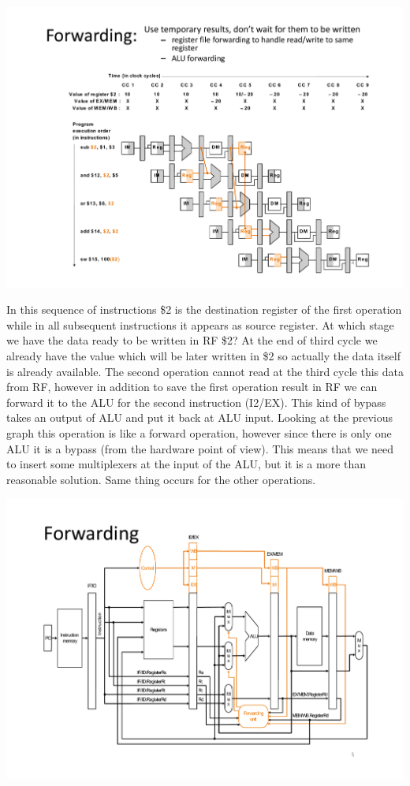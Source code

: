 \begin{center}
  \includegraphics[width=1.0\linewidth]{img/img3/mips3}
\end{center}
In this sequence of instructions \$2 is the destination register of the first
operation while in all subsequent instructions it appears as source register.
At which stage we have the data ready to be written in RF \$2? At the end of
third cycle we already have the value which will be later written in \$2 so
actually the data itself is already available. The second operation cannot read
at the third cycle this data from RF, however in addition to save the first
operation result in RF we can forward it to the ALU for the second instruction
(I2/EX). This kind of bypass takes an output of ALU and put it back at ALU
input. Looking at the previous graph this operation is like a forward operation,
however since there is only one ALU it is a bypass (from the hardware point of
view). This means that we need to insert some multiplexers at the input of the
ALU, but it is a more than reasonable solution. Same thing occurs for the other
operations.

\begin{center}
  \includegraphics[width=0.8\linewidth]{img/img3/mips4}
\end{center}

